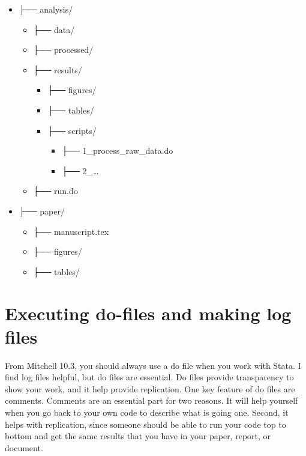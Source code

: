 \documentclass[
]{book}
\providecommand{\tightlist}{%
  \setlength{\itemsep}{0pt}\setlength{\parskip}{0pt}}
\begin{document}
\begin{itemize}
\tightlist
\item
  ├── analysis/

  \begin{itemize}
  \tightlist
  \item
    ├── data/
  \item
    ├── processed/
  \item
    ├── results/

    \begin{itemize}
    \tightlist
    \item
      ├── figures/
    \item
      ├── tables/
    \item
      ├── scripts/

      \begin{itemize}
      \tightlist
      \item
        ├── 1\_process\_raw\_data.do
      \item
        ├── 2\_\ldots{}
      \end{itemize}
    \end{itemize}
  \item
    ├── run.do
  \end{itemize}
\item
  ├── paper/

  \begin{itemize}
  \tightlist
  \item
    ├── manuscript.tex
  \item
    ├── figures/
  \item
    ├── tables/
  \end{itemize}
\end{itemize}

\chapter{Executing do-files and making log files}\label{executing-do-files-and-making-log-files}

From Mitchell 10.3, you should always use a do file when you work with Stata. I find log files helpful, but do files are essential. Do files provide transparency to show your work, and it help provide replication. One key feature of do files are comments. Comments are an essential part for two reasons. It will help yourself when you go back to your own code to describe what is going one. Second, it helps
with replication, since someone should be able to run your code top to bottom and get the same results that you have in your paper, report, or document.
\end{document}
